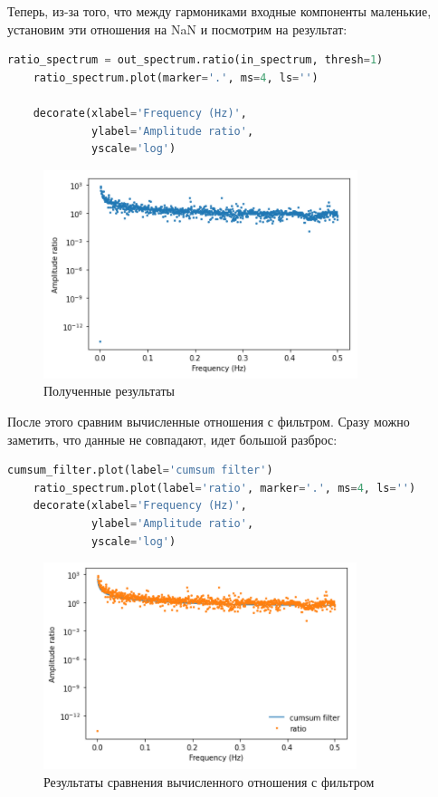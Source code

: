 \documentclass[a4paper]{article}
\begin{document}
            Теперь, из-за того, что между гармониками входные компоненты маленькие, установим эти отношения на NaN и посмотрим на результат:
            
\begin{lstlisting}[language=Python, caption= \texttt{Ratio spectrum}]
    ratio_spectrum = out_spectrum.ratio(in_spectrum, thresh=1)
    ratio_spectrum.plot(marker='.', ms=4, ls='')
    
    decorate(xlabel='Frequency (Hz)',
             ylabel='Amplitude ratio',
             yscale='log')
\end{lstlisting}
            
            \begin{figure}[H]
                \centering
                \includegraphics{ex_1_new_ratio_spectr.png}
                \caption{Полученные результаты}
                \label{fig:ex_1_new_ratio_spectr}
            \end{figure}
            
            После этого сравним вычисленные отношения с фильтром. Сразу можно заметить, что данные не совпадают, идет большой разброс:
            
\begin{lstlisting}[language=Python, caption= Сравнение вычисленного отношения с фильтром]
    cumsum_filter.plot(label='cumsum filter')
    ratio_spectrum.plot(label='ratio', marker='.', ms=4, ls='')
    decorate(xlabel='Frequency (Hz)',
             ylabel='Amplitude ratio',
             yscale='log')
\end{lstlisting}
            
            \begin{figure}[H]
                \centering
                \includegraphics{ex_1_new_custom_filret.png}
                \caption{Результаты сравнения вычисленного отношения с фильтром}
                \label{fig:ex_1_new_custom_filret}
            \end{figure}
            
\end{document}

